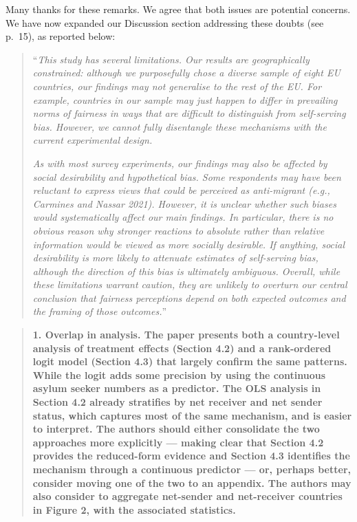 \documentclass[
  11pt,
]{article}
\begin{document}
Many thanks for these remarks. We agree that both issues are potential concerns. We have now expanded our Discussion section addressing these doubts (see p.~15), as reported below:

\begin{quote}
``\emph{This study has several limitations. Our results are geographically constrained: although we purposefully chose a diverse sample of eight EU countries, our findings may not generalise to the rest of the EU. For example, countries in our sample may just happen to differ in prevailing norms of fairness in ways that are difficult to distinguish from self-serving bias. However, we cannot fully disentangle these mechanisms with the current experimental design.}

\emph{As with most survey experiments, our findings may also be affected by social desirability and hypothetical bias. Some respondents may have been reluctant to express views that could be perceived as anti-migrant (e.g., Carmines and Nassar 2021). However, it is unclear whether such biases would systematically affect our main findings. In particular, there is no obvious reason why stronger reactions to absolute rather than relative information would be viewed as more socially desirable. If anything, social desirability is more likely to attenuate estimates of self-serving bias, although the direction of this bias is ultimately ambiguous. Overall, while these limitations warrant caution, they are unlikely to overturn our central conclusion that fairness perceptions depend on both expected outcomes and the framing of those outcomes.}''
\end{quote}

\begin{quote}
\textbf{1. Overlap in analysis. The paper presents both a country-level analysis of treatment effects (Section 4.2) and a rank-ordered logit model (Section 4.3) that largely confirm the same patterns. While the logit adds some precision by using the continuous asylum seeker numbers as a predictor. The OLS analysis in Section 4.2 already stratifies by net receiver and net sender status, which captures most of the same mechanism, and is easier to interpret. The authors should either consolidate the two approaches more explicitly --- making clear that Section 4.2 provides the reduced-form evidence and Section 4.3 identifies the mechanism through a continuous predictor --- or, perhaps better, consider moving one of the two to an appendix. The authors may also consider to aggregate net-sender and net-receiver countries in Figure 2, with the associated statistics.}
\end{quote}
\end{document}
